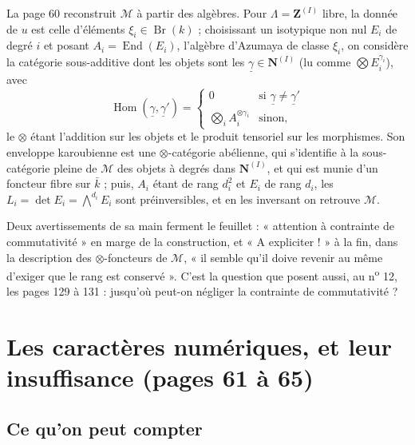 \documentclass[11pt,a4paper]{article}
\begin{document}
La page 60 reconstruit $\mathcal{M}$ à partir des algèbres. Pour $\Lambda =
\mathbf{Z}^{(I)}$ libre, la donnée de $u$ est celle d'éléments $\xi_{i} \in
\operatorname{Br}(k)$ ; choisissant un isotypique non nul $E_{i}$ de degré $i$
et posant $A_{i} = \operatorname{End}(E_{i})$, l'algèbre d'Azumaya de classe
$\xi_{i}$, on considère la catégorie sous-additive dont les objets sont les
$\underline{\gamma} \in \mathbf{N}^{(I)}$ (lu comme $\bigotimes
E_{i}^{\gamma_{i}}$), avec
\[
\operatorname{Hom}(\underline{\gamma}, \underline{\gamma}')
= \begin{cases}
0 & \text{si } \underline{\gamma} \neq \underline{\gamma}' \\
\bigotimes_{i} A_{i}^{\otimes \gamma_{i}} & \text{sinon,}
\end{cases}
\]
le $\otimes$ étant l'addition sur les objets et le produit tensoriel sur les
morphismes. Son enveloppe karoubienne est une $\otimes$-catégorie abélienne,
qui s'identifie à la sous-catégorie pleine de $\mathcal{M}$ des objets à degrés
dans $\mathbf{N}^{(I)}$, et qui est munie d'un foncteur fibre sur $\bar{k}$ ;
puis, $A_{i}$ étant de rang $d_{i}^{2}$ et $E_{i}$ de rang $d_{i}$, les
$L_{i} = \det E_{i} = \bigwedge^{d_{i}} E_{i}$ sont préinversibles, et en les
inversant on retrouve $\mathcal{M}$.

Deux avertissements de sa main ferment le feuillet : « attention à contrainte de commutativité » en marge de
la construction, et « A expliciter ! » à la fin, dans la description des
$\otimes$-foncteurs de $\mathcal{M}$, « il semble qu'il doive revenir au même
d'exiger que le rang est conservé ». C'est la question que posent aussi, au
n\textsuperscript{o} 12, les pages 129 à 131 : jusqu'où peut-on négliger la
contrainte de commutativité ?

\section*{Les caractères numériques, et leur insuffisance (pages 61 à 65)}

\subsection*{Ce qu'on peut compter}
\end{document}
